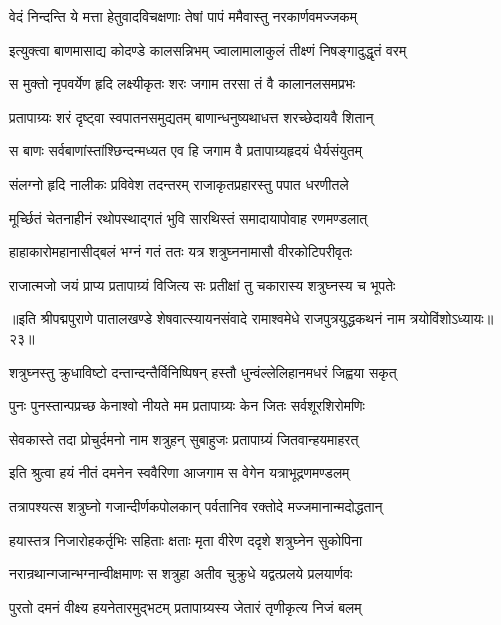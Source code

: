 \twolineshloka
{वेदं निन्दन्ति ये मत्ता हेतुवादविचक्षणाः}
{तेषां पापं ममैवास्तु नरकार्णवमज्जकम्}%

\twolineshloka
{इत्युक्त्वा बाणमासाद्य कोदण्डे कालसन्निभम्}
{ज्वालामालाकुलं तीक्ष्णं निषङ्गादुद्धृतं वरम्}%

\twolineshloka
{स मुक्तो नृपवर्येण हृदि लक्ष्यीकृतः शरः}
{जगाम तरसा तं वै कालानलसमप्रभः}%

\twolineshloka
{प्रतापाग्र्यः शरं दृष्ट्वा स्वपातनसमुद्यतम्}
{बाणान्धनुष्यथाधत्त शरच्छेदायवै शितान्}%

\twolineshloka
{स बाणः सर्वबाणांस्तांश्छिन्दन्मध्यत एव हि}
{जगाम वै प्रतापाग्र्यहृदयं धैर्यसंयुतम्}%

\twolineshloka
{संलग्नो हृदि नालीकः प्रविवेश तदन्तरम्}
{राजाकृतप्रहारस्तु पपात धरणीतले}%

\twolineshloka
{मूर्च्छितं चेतनाहीनं रथोपस्थाद्गतं भुवि}
{सारथिस्तं समादायापोवाह रणमण्डलात्}%

\twolineshloka
{हाहाकारोमहानासीद्बलं भग्नं गतं ततः}
{यत्र शत्रुघ्ननामासौ वीरकोटिपरीवृतः}%

\twolineshloka
{राजात्मजो जयं प्राप्य प्रतापाग्र्यं विजित्य सः}
{प्रतीक्षां तु चकारास्य शत्रुघ्नस्य च भूपतेः}%

॥इति श्रीपद्मपुराणे पातालखण्डे शेषवात्स्यायनसंवादे रामाश्वमेधे राजपुत्रयुद्धकथनं नाम त्रयोविंशोऽध्यायः॥२३॥



\twolineshloka
{शत्रुघ्नस्तु क्रुधाविष्टो दन्तान्दन्तैर्विनिष्पिषन्}
{हस्तौ धुन्वंल्लेलिहानमधरं जिह्वया सकृत्}%

\twolineshloka
{पुनः पुनस्तान्पप्रच्छ केनाश्वो नीयते मम}
{प्रतापाग्र्यः केन जितः सर्वशूरशिरोमणिः}%

\twolineshloka
{सेवकास्ते तदा प्रोचुर्दमनो नाम शत्रुहन्}
{सुबाहुजः प्रतापाग्र्यं जितवान्हयमाहरत्}%

\twolineshloka
{इति श्रुत्वा हयं नीतं दमनेन स्ववैरिणा}
{आजगाम स वेगेन यत्राभूद्रणमण्डलम्}%

\twolineshloka
{तत्रापश्यत्स शत्रुघ्नो गजान्दीर्णकपोलकान्}
{पर्वतानिव रक्तोदे मज्जमानान्मदोद्धतान्}%

\twolineshloka
{हयास्तत्र निजारोहकर्तृभिः सहिताः क्षताः}
{मृता वीरेण ददृशे शत्रुघ्नेन सुकोपिना}%

\twolineshloka
{नरान्रथान्गजान्भग्नान्वीक्षमाणः स शत्रुहा}
{अतीव चुक्रुधे यद्वत्प्रलये प्रलयार्णवः}%

\twolineshloka
{पुरतो दमनं वीक्ष्य हयनेतारमुद्भटम्}
{प्रतापाग्र्यस्य जेतारं तृणीकृत्य निजं बलम्}%

